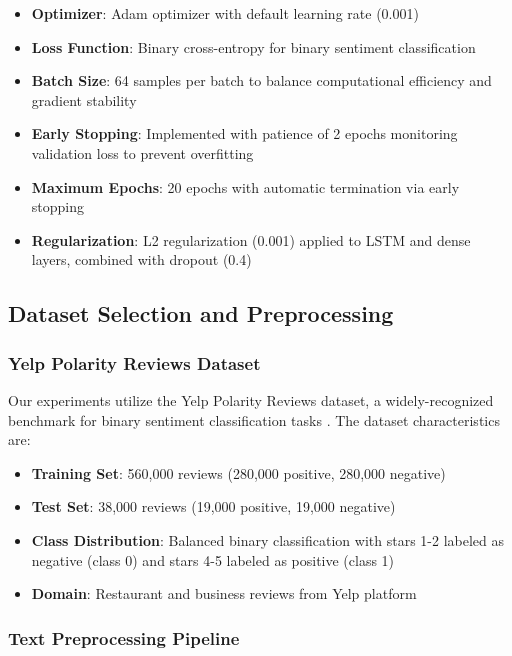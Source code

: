 \documentclass[../main.tex]{subfiles}
\begin{document}
\begin{itemize}
\item \textbf{Optimizer}: Adam optimizer with default learning rate (0.001)
\item \textbf{Loss Function}: Binary cross-entropy for binary sentiment classification
\item \textbf{Batch Size}: 64 samples per batch to balance computational efficiency and gradient stability
\item \textbf{Early Stopping}: Implemented with patience of 2 epochs monitoring validation loss to prevent overfitting
\item \textbf{Maximum Epochs}: 20 epochs with automatic termination via early stopping
\item \textbf{Regularization}: L2 regularization (0.001) applied to LSTM and dense layers, combined with dropout (0.4)
\end{itemize}

\subsection{Dataset Selection and Preprocessing}

\subsubsection{Yelp Polarity Reviews Dataset}

Our experiments utilize the Yelp Polarity Reviews dataset, a widely-recognized benchmark for binary sentiment classification tasks \cite{morris2020textattack}. The dataset characteristics are:

\begin{itemize}
\item \textbf{Training Set}: 560,000 reviews (280,000 positive, 280,000 negative)
\item \textbf{Test Set}: 38,000 reviews (19,000 positive, 19,000 negative)
\item \textbf{Class Distribution}: Balanced binary classification with stars 1-2 labeled as negative (class 0) and stars 4-5 labeled as positive (class 1)
\item \textbf{Domain}: Restaurant and business reviews from Yelp platform
\end{itemize}

\subsubsection{Text Preprocessing Pipeline}
\end{document}
